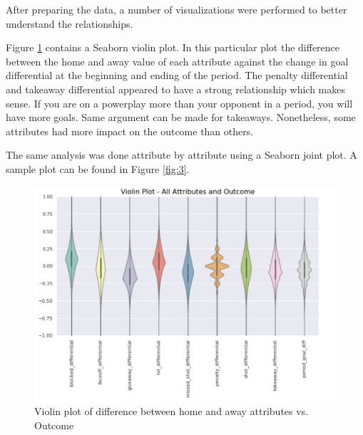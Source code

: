 \documentclass[twocolumn,letterpaper,12pt,notitlepage]{article}
\begin{document}
\begin{table}[t]
  \centering
  \caption{NHL game data prepared sample}
  \label{tab:1}
\end{table}

After preparing the data, a number of visualizations were performed to better understand the relationships. 

Figure \ref{fig:2} contains a Seaborn violin plot. In this particular plot the difference between the home and away value of each attribute against the change in goal differential at the beginning and ending of the period. The penalty differential and takeaway differential appeared to have a strong relationship which makes sense. If you are on a powerplay more than your opponent in a period, you will have more goals. Same argument can be made for takeaways. Nonetheless, some attributes had more impact on the outcome than others.

The same analysis was done attribute by attribute using a Seaborn joint plot. A sample plot can be found in Figure \ref{fig:3}.

\begin{figure}[htp]
\centering
\includegraphics[width=\linewidth]{violin}
\caption{Violin plot of difference between home and away attributes vs. Outcome}
\label{fig:2}
\end{figure}
\end{document}
